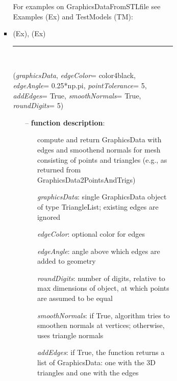 \begin{itemize}[leftmargin=1.4cm]
\begin{itemize}[leftmargin=1.4cm]
\begin{itemize}[leftmargin=0.5cm]
\begin{itemize}[leftmargin=1.4cm]
\begin{itemize}[leftmargin=1.4cm]
\begin{itemize}[leftmargin=0.5cm]
\begin{itemize}[leftmargin=1.4cm]
\begin{itemize}[leftmargin=0.5cm]
%
%
\noindent For examples on GraphicsDataFromSTLfile see Examples (Ex) and TestModels (TM):
\bi
 \item \footnotesize {} (Ex), 
 (Ex)\ei

%
\noindent\rule{8cm}{0.75pt}\vspace{1pt} \\ 
\begin{flushleft}
\label{sec:graphicsDataUtilities:AddEdgesAndSmoothenNormals}
({\it graphicsData}, {\it edgeColor}= color4black, {\it edgeAngle}= 0.25*np.pi, {\it pointTolerance}= 5, {\it addEdges}= True, {\it smoothNormals}= True, {\it roundDigits}= 5)
\end{flushleft}
\setlength{\itemindent}{0.7cm}
\begin{itemize}[leftmargin=0.7cm]
  \item[--]  {\bf function description}: \vspace{-6pt}
  \begin{itemize}[leftmargin=1.2cm]
\setlength{\itemindent}{-0.7cm}
    \item[] compute and return GraphicsData with edges and smoothend normals for mesh consisting of points and triangles (e.g., as returned from GraphicsData2PointsAndTrigs)
    \item[] {\it   graphicsData}: single GraphicsData object of type TriangleList; existing edges are ignored
    \item[] {\it   edgeColor}: optional color for edges
    \item[] {\it   edgeAngle}: angle above which edges are added to geometry
    \item[] {\it   roundDigits}: number of digits, relative to max dimensions of object, at which points are assumed to be equal
    \item[] {\it   smoothNormals}: if True, algorithm tries to smoothen normals at vertices; otherwise, uses triangle normals
    \item[] {\it   addEdges}: if True, the function returns a list of GraphicsData: one with the 3D triangles and one with the edges
  \end{itemize}

\end{itemize}
\end{itemize}
\end{itemize}
\end{itemize}
\end{itemize}
\end{itemize}
\end{itemize}
\end{itemize}
\end{itemize}
